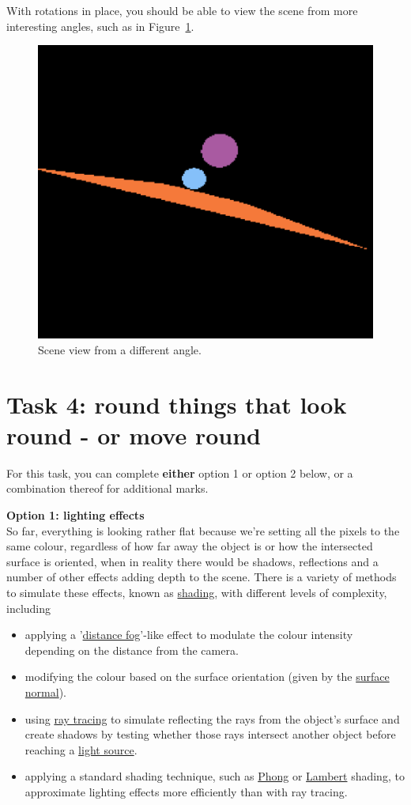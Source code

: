 \documentclass{../../../fal_assignment}
\begin{document}
With rotations in place, you should be able to view the scene from more interesting angles, such as in Figure~\ref{fig:rotate}.

\begin{figure}[ht]
	\begin{center}
		\includegraphics[width=0.25\linewidth]{rotate}
	\end{center}
	\caption{Scene view from a different angle.}
	\label{fig:rotate}
\end{figure}

\section*{Task 4: round things that look round - or move round}

For this task, you can complete \textbf{either} option 1 or option 2 below, or a combination thereof for additional marks.

\textbf{Option 1: lighting effects}\\
So far, everything is looking rather flat because we're setting all the pixels to the same colour, regardless of how far away the object is or how the intersected surface is oriented, when in reality there would be shadows, reflections and a number of other effects adding depth to the scene. There is a variety of methods to simulate these effects, known as \href{https://www.scratchapixel.com/lessons/3d-basic-rendering/introduction-to-shading}{shading}, with different levels of complexity, including
\begin{itemize}
	\item applying a '\href{https://en.wikipedia.org/wiki/Distance_fog}{distance fog}'-like effect to modulate the colour intensity depending on the distance from the camera.
	\item modifying the colour based on the surface orientation (given by the \href{https://mathworld.wolfram.com/NormalVector.html}{surface normal}).
	\item using \href{https://www.scratchapixel.com/lessons/3d-basic-rendering/introduction-to-ray-tracing}{ray tracing} to simulate reflecting the rays from the object's surface and create shadows by testing whether those rays intersect another object before reaching a \href{https://www.scratchapixel.com/lessons/3d-basic-rendering/introduction-to-shading/shading-lights}{light source}.
	\item applying a standard shading technique, such as \href{https://www.scratchapixel.com/lessons/3d-basic-rendering/phong-shader-BRDF}{Phong} or \href{https://www.scratchapixel.com/lessons/3d-basic-rendering/introduction-to-shading/diffuse-lambertian-shading}{Lambert} shading, to approximate lighting effects more efficiently than with ray tracing.
\end{itemize}
\end{document}

